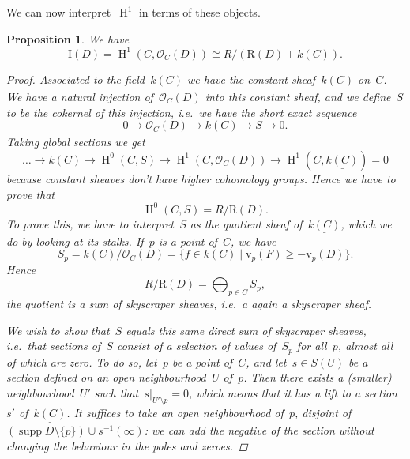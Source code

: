 \documentclass[10pt,a4paper]{article}
\theoremstyle{lecture}
\newtheorem{proposition}[theorem]{Proposition}
\DeclareMathOperator\HH{H}
\DeclareMathOperator\supp{supp}
\begin{document}
We can now interpret~$\HH^1$ in terms of these objects.
\begin{proposition}
  \label{proposition:HH1}
  We have
  \begin{equation}
    \mathrm{I}(D)=\HH^1(C,\mathcal{O}_C(D))\cong R/(\mathrm{R}(D)+k(C)).
  \end{equation}

  \begin{proof}
    Associated to the field~$k(C)$ we have the constant sheaf~$\underline{k(C)}$ on~$C$. We have a natural injection of~$\mathcal{O}_C(D)$ into this constant sheaf, and we define~$S$ to be the cokernel of this injection, i.e.\ we have the short exact sequence
    \begin{equation}
      0\to\mathcal{O}_C(D)\to\underline{k(C)}\to S\to 0.
    \end{equation}
    Taking global sections we get
    \begin{equation}
      \dotso\to k(C)\to\HH^0(C,S)\to\HH^1(C,\mathcal{O}_C(D))\to\HH^1(C,\underline{k(C)})=0
    \end{equation}
    because constant sheaves don't have higher cohomology groups. Hence we have to prove that
    \begin{equation}
      \HH^0(C,S)=R/\mathrm{R}(D).
    \end{equation}
    To prove this, we have to interpret~$S$ as the quotient sheaf of~$\underline{k(C)}$, which we do by looking at its stalks. If~$p$ is a point of~$C$, we have
    \begin{equation}
      S_p=k(C)/\mathcal{O}_C(D)=\{f\in k(C)\mid \mathrm{v}_p(F)\geq -\mathrm{v}_p(D)\}.
    \end{equation}
    Hence
    \begin{equation}
      R/\mathrm{R}(D)=\bigoplus_{p\in C}S_p,
    \end{equation}
    the quotient is a sum of skyscraper sheaves, i.e.\ a again a skyscraper sheaf.

    We wish to show that~$S$ equals this same direct sum of skyscraper sheaves, i.e.\ that sections of~$S$ consist of a selection of values of~$S_p$ for all~$p$, almost all of which are zero. To do so, let~$p$ be a point of~$C$, and let~$s\in S(U)$ be a section defined on an open neighbourhood~$U$ of~$p$. Then there exists a (smaller) neighbourhood~$U'$ such that~$s|_{U'\setminus p}=0$, which means that it has a lift to a section~$s'$ of~$\underline{k(C)}$. It suffices to take an open neighbourhood of~$p$, disjoint of~$(\supp D\setminus\{p\})\cup s^{-1}(\infty)$: we can add the negative of the section without changing the behaviour in the poles and zeroes.
  \end{proof}
\end{proposition}
\end{document}
